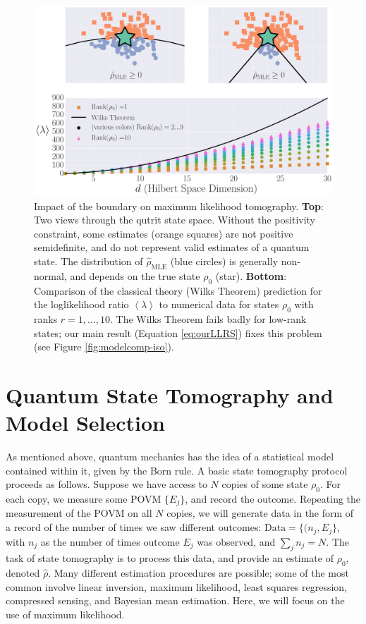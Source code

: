 \documentclass[aps,pra, twocolumn]{revtex4-1}
\newcommand{\expect}[1]{\ensuremath{\left\langle#1\right\rangle}}
\newcommand{\rhohat}{\hat{\rho}}
\newcommand{\rhoMLE}{\rhohat_{\scriptscriptstyle\mathrm{MLE}}}
\begin{document}
\begin{figure}[h]
\includegraphics[width=\columnwidth]{Images/Figure_1.pdf}
 \caption{Impact of the boundary on maximum likelihood tomography. \textbf{Top}: Two views through the qutrit state space. Without the positivity constraint, some estimates (orange squares) are not positive semidefinite, and do not represent valid estimates of a quantum state. The distribution of $\rhoMLE$ (blue circles) is generally non-normal, and depends on the true state $\rho_{0}$ (star).
\textbf{Bottom}:  Comparison of the classical theory (Wilks Theorem) prediction for the loglikelihood ratio $\expect{\lambda}$ to numerical data for states $\rho_{0}$ with ranks $r=1,\ldots ,10$.  The Wilks Theorem fails badly for low-rank states; our main result (Equation \ref{eq:ourLLRS}) fixes this problem (see Figure \ref{fig:modelcomp-iso}).}
\label{fig:boundaries}
\end{figure}

\section{Quantum State Tomography and Model Selection}
As mentioned above, quantum mechanics has the idea of a statistical model contained within it, given by the Born rule. A basic state tomography protocol proceeds as follows. Suppose we have access to $N$ copies of some state $\rho_{0}$. For each copy, we measure some POVM $\{E_{j}\}$, and record the outcome. Repeating the measurement of the POVM on all $N$ copies, we will generate data in the form of a record of the number of times we saw different outcomes: $\mathrm{Data} = \{(n_{j}, E_{j}\}$, with $n_{j}$ as the number of times outcome $E_{j}$ was observed, and $\sum_{j}n_{j} = N$. The task of state tomography is to process this data, and provide an estimate of $\rho_{0}$, denoted $\rhohat$. Many different estimation procedures are possible; some of the most common involve linear inversion, maximum likelihood, least squares regression, compressed sensing, and Bayesian mean estimation. Here, we will focus on the use of maximum likelihood.
\end{document}

